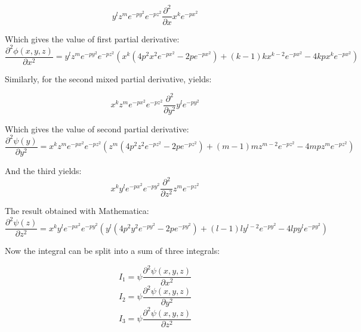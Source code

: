 \begin{equation}
	y^l z^m e^{-py^2}e^{-pz^2} \frac{\partial^2}{\partial x} x^k e^{-px^2}
\end{equation}

\noindent Which gives the value of first partial derivative:
\begin{equation}
	\frac{\partial^2\phi(x,y,z)}{\partial x^2} = y^l z^m e^{-py^2}e^{-pz^2}  \left(x^k (4 p^2 x^2 e^{-p x^2}-2 p e^{-p x^2})+(k-1) k x^{k-2} e^{-p x^2}-4 k p x^k e^{-p x^2}\right)
\end{equation}

\noindent Similarly, for the second mixed partial derivative, yields:

\begin{equation}
	x^k z^m e^{-px^2}e^{-pz^2} \frac{\partial^2}{\partial y^2} y^l e^{-py^2}
\end{equation}

\noindent Which gives the value of second partial derivative:
\begin{equation}
	\frac{\partial^2\psi(y)}{\partial y^2} =  x^k z^m e^{-px^2}e^{-pz^2} \left( z^m (4 p^2 z^2 e^{-p z^2}-2 p e^{-p z^2})+(m-1) m z^{m-2} e^{-p z^2}-4 m p z^m e^{-p z^2} \right)
\end{equation}

\noindent And the third yields:
\begin{equation}
	x^k y^l e^{-px^2}e^{-py^2} \frac{\partial^2}{\partial z^2} z^m e^{-pz^2}
\end{equation}

\noindent The result obtained with Mathematica:
\begin{equation}
	\frac{\partial^2\psi(z)}{\partial z^2} = x^k y^l e^{-px^2}e^{-py^2} \left( y^l (4 p^2 y^2 e^{-p y^2}-2 p e^{-p y^2})+(l-1) l y^{l-2} e^{-p y^2}-4 l p y^l e^{-p y^2}\right)
\end{equation}

\noindent Now the integral can be split into a sum of three integrals:

\begin{equation}
	I_1 = \psi \frac{\partial^2\psi(x,y,z)}{\partial x^2}
\end{equation}
\begin{equation}
	I_2 = \psi \frac{\partial^2\psi(x,y,z)}{\partial y^2}
\end{equation}
\begin{equation}
	I_3 = \psi \frac{\partial^2\psi(x,y,z)}{\partial z^2}
\end{equation}


